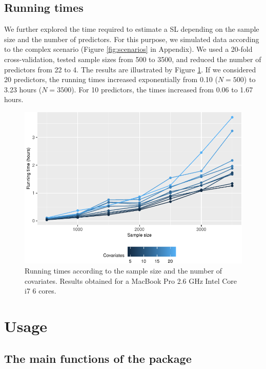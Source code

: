 \hypertarget{running-times}{%
\subsection{Running times}\label{running-times}}

We further explored the time required to estimate a SL depending on the sample size and the number of predictors. For this purpose, we simulated data according to the complex scenario (Figure \ref{fig:scenarios} in Appendix). We used a 20-fold cross-validation, tested sample sizes from 500 to 3500, and reduced the number of predictors from 22 to 4. The results are illustrated by Figure \ref{fig:run-ggplot}. If we considered 20 predictors, the running times increased exponentially from 0.10 (\(N=500\)) to 3.23 hours (\(N=3500\)). For 10 predictors, the times increased from 0.06 to 1.67 hours.

\begin{figure}

{\centering \includegraphics{RJ-2024-037_files/figure-latex/run-ggplot-1} 

}

\caption{Running times according to the sample size and the number of covariates. Results obtained for a MacBook Pro 2.6 GHz Intel Core i7 6 cores.}\label{fig:run-ggplot}
\end{figure}

\hypertarget{usage}{%
\section{Usage}\label{usage}}

\hypertarget{the-main-functions-of-the-package}{%
\subsection{The main functions of the package}\label{the-main-functions-of-the-package}}

